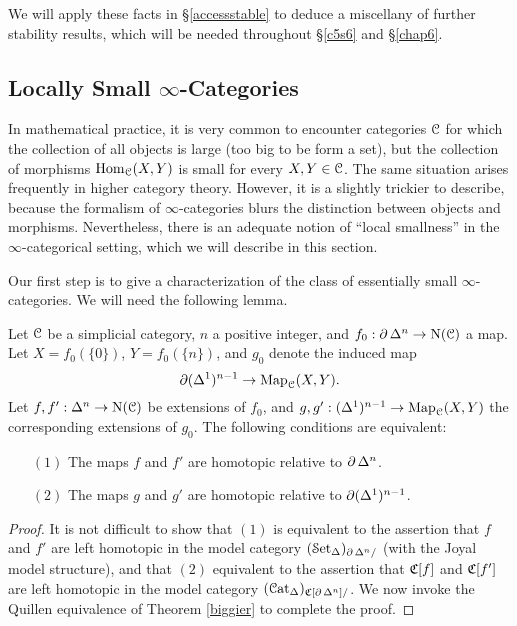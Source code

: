 We will apply these facts in \S \ref{accessstable} to deduce a miscellany of further stability results, which will be needed throughout \S \ref{c5s6} and \S \ref{chap6}.

\subsection{Locally Small $\infty$-Categories}\label{locbrend}

In mathematical practice, it is very common to encounter categories $\operatorname{\mathcal{C}}$ for which the collection of all objects is large (too big to be form a set), but the collection of morphisms $\operatorname{Hom}_{\operatorname{\mathcal{C}}}(X,Y)$ is small for every $X,Y \in \operatorname{\mathcal{C}}$. The same situation arises frequently in higher category theory.
However, it is a slightly trickier to describe, because the formalism of $\infty$-categories blurs the distinction between objects and morphisms. Nevertheless, there is an adequate notion of ``local smallness'' in the $\infty$-categorical setting, which we will describe in this section.

Our first step is to give a characterization of the class of essentially small $\infty$-categories. We will need the following lemma.

\begin{lemma}\label{soirt}
Let $\operatorname{\mathcal{C}}$ be a simplicial category, $n$ a positive integer, and
$f_0: \operatorname{\partial} \Delta^n \rightarrow \operatorname{N}(\operatorname{\mathcal{C}})$ a map. Let
$X = f_0 ( \{0 \})$, $Y = f_0 ( \{n\} )$, and $g_0$ denote the induced map
$$\operatorname{\partial} (\Delta^1)^{n-1} \rightarrow \operatorname{{Map}}_{\operatorname{\mathcal{C}}}(X,Y).$$
Let $f,f': \Delta^n \rightarrow \operatorname{N}(\operatorname{\mathcal{C}})$ be extensions of $f_0$, and
$g,g': (\Delta^1)^{n-1} \rightarrow \operatorname{{Map}}_{\operatorname{\mathcal{C}}}(X,Y)$ the corresponding extensions
of $g_0$. The following conditions are equivalent:
\begin{itemize}
\item[$(1)$] The maps $f$ and $f'$ are homotopic relative to $\operatorname{\partial} \Delta^n$.
\item[$(2)$] The maps $g$ and $g'$ are homotopic relative to $\operatorname{\partial} (\Delta^1)^{n-1}$.
\end{itemize}
\end{lemma}

\begin{proof}
It is not difficult to show that $(1)$ is equivalent to the assertion that $f$ and $f'$ are left homotopic in the model category $(\operatorname{\mathcal{S}et_{\Delta}})_{\operatorname{\partial} \Delta^n /}$ (with the Joyal model structure), and that $(2)$ equivalent to the assertion that $\operatorname{\mathfrak{C}}[f]$ and $\operatorname{\mathfrak{C}}[f']$ are left homotopic in the model category $(\operatorname{\mathcal{C}at_{\Delta}})_{ \operatorname{\mathfrak{C}}[ \operatorname{\partial} \Delta^n] /}$. We now invoke the Quillen equivalence of Theorem \ref{biggier} to complete the proof.
\end{proof}

